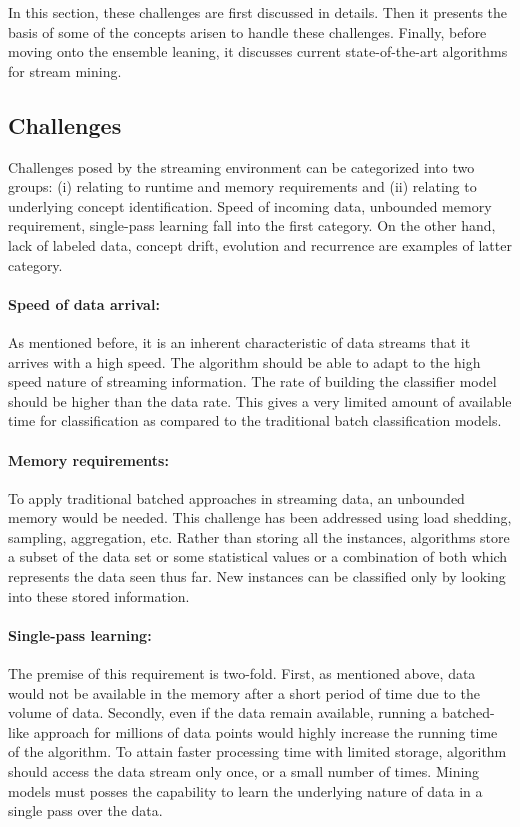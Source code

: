 In this section, these challenges are first discussed in details. Then it presents the basis of some of the concepts arisen to handle these challenges. Finally, before moving onto the ensemble leaning, it discusses current state-of-the-art algorithms for stream mining.

\subsection{Challenges}
Challenges posed by the streaming environment can be categorized into two groups: (i) relating to runtime and memory requirements and (ii) relating to underlying concept identification. Speed of incoming data, unbounded memory requirement, single-pass learning fall into the first category. On the other hand, lack of labeled data, concept drift, evolution and recurrence are examples of latter category.

\paragraph{Speed of data arrival:}
As mentioned before, it is an inherent characteristic of data streams that it arrives with a high speed. The algorithm should be able to adapt to the high speed nature of streaming information. The rate of building the classifier model should be higher than the data rate. This gives a very limited amount of available time for classification as compared to the traditional batch classification models.

\paragraph{Memory requirements:}
To apply traditional batched approaches in streaming data, an unbounded memory would be needed. This challenge has been addressed using load shedding, sampling, aggregation, etc. Rather than storing all the instances, algorithms store a subset of the data set or some statistical values or a combination of both which represents the data seen thus far. New instances can be classified only by looking into these stored information. 

\paragraph{Single-pass learning:}
The premise of this requirement is two-fold. First, as mentioned above, data would not be available in the memory after a short period of time due to the volume of data. Secondly, even if the data remain available, running a batched-like approach for millions of data points would highly increase the running time of the algorithm. To attain faster processing time with limited storage, algorithm should access the data stream only once, or a small number of times. Mining models must posses the capability to learn the underlying nature of data in a single pass over the data.

